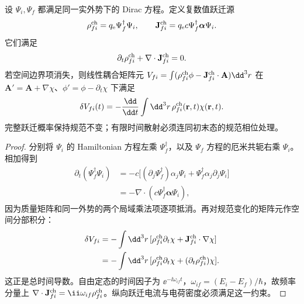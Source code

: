 \begin{proposition}[跃迁电流的连续性与规范端点项]
设 $\Psi_i,\Psi_f$ 都满足同一实外势下的 Dirac 方程。定义复数值跃迁源
\begin{equation*}
 \rho_{fi}^{\rm ch}=q_{\mathrm e}\Psi_f^\dagger\Psi_i,
 \qquad \mathbf J_{fi}^{\rm ch}=q_{\mathrm e}c\Psi_f^\dagger\boldsymbol\alpha\Psi_i.
\end{equation*}
它们满足
\begin{equation}
 \partial_t\rho_{fi}^{\rm ch}+\nabla\cdot\mathbf J_{fi}^{\rm ch}=0.
 \label{eq:feqo-transition-current-continuity}
\end{equation}
若空间边界项消失，则线性耦合矩阵元
$V_{fi}=\int(\rho_{fi}^{\rm ch}\phi-\mathbf J_{fi}^{\rm ch}\cdot\mathbf A)\dd^3r$
在 $\mathbf A' =\mathbf A+\nabla\chi$、$\phi'=\phi-\partial_t\chi$ 下满足
\begin{equation}
 \delta V_{fi}(t)=-\frac{\dd}{\dd t}\int\dd^3r\,\rho_{fi}^{\rm ch}(\mathbf r,t)\chi(\mathbf r,t).
 \label{eq:feqo-transition-gauge-endpoint}
\end{equation}
完整跃迁概率保持规范不变；有限时间散射必须连同初末态的规范相位处理。
\end{proposition}

\begin{proof}
分别将 $\Psi_i$ 的 Hamiltonian 方程左乘 $\Psi_f^\dagger$，以及 $\Psi_f$ 方程的厄米共轭右乘 $\Psi_i$。相加得到
\begin{align*}
 \partial_t(\Psi_f^\dagger\Psi_i)
 &=-c\big[(\partial_j\Psi_f^\dagger)\alpha_j\Psi_i
 +\Psi_f^\dagger\alpha_j\partial_j\Psi_i\big]\\
 &=-\nabla\cdot(c\Psi_f^\dagger\boldsymbol\alpha\Psi_i),
\end{align*}
因为质量矩阵和同一外势的两个局域乘法项逐项抵消。再对规范变化的矩阵元作空间分部积分：
\begin{align*}
 \delta V_{fi}
 &=-\int\dd^3r\,[\rho_{fi}^{\rm ch}\partial_t\chi
 +\mathbf J_{fi}^{\rm ch}\cdot\nabla\chi]\\
 &=-\int\dd^3r\,[\rho_{fi}^{\rm ch}\partial_t\chi
 +(\partial_t\rho_{fi}^{\rm ch})\chi].
\end{align*}
这正是总时间导数。自由定态的时间因子为 $\ee^{-\ii\omega_{if}t}$，$\omega_{if}=(E_i-E_f)/\hbar$，故频率分量上 $\nabla\cdot\mathbf J_{fi}^{\rm ch}=\ii\omega_{if}\rho_{fi}^{\rm ch}$。纵向跃迁电流与电荷密度必须满足这一约束。
\end{proof}

